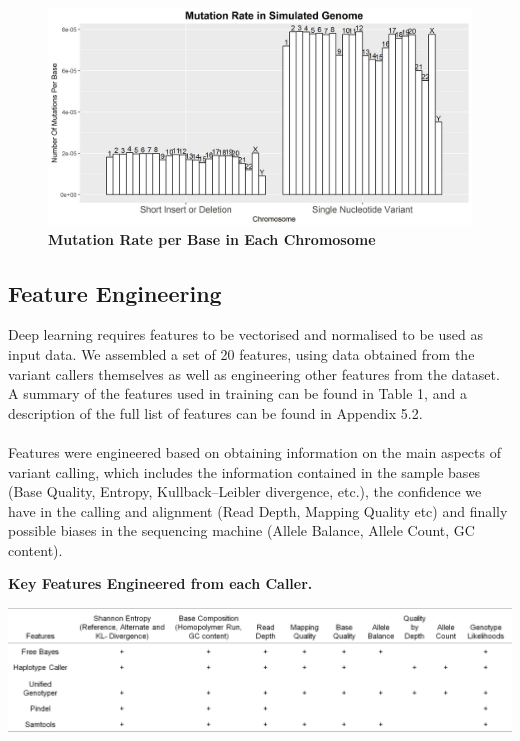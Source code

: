 \documentclass{article}
\begin{document}
\begin{figure}[H]
\centering
\includegraphics[width=\textwidth]{MutationRateInSimulatedGenome.jpg}
\caption{\textbf{Mutation Rate per Base in Each Chromosome}}
\end{figure}

\subsection{Feature Engineering}
Deep learning requires features to be vectorised and normalised to be used as input data. We assembled a set of 20 features, using data obtained from the variant callers themselves as well as engineering other features from the dataset. A summary of the features used in training can be found in Table 1, and a description of the full list of features can be found in Appendix 5.2.\\\\
Features were engineered based on obtaining information on the main aspects of variant calling, which includes the information contained in the sample bases (Base Quality, Entropy, Kullback–Leibler divergence, etc.), the confidence we have in the calling and alignment (Read Depth, Mapping Quality etc) and finally possible biases in the sequencing machine (Allele Balance, Allele Count, GC content).

\begin{table}[H]
\caption{\textbf{Key Features Engineered from each Caller.}}
\includegraphics[width=\textwidth]{featureengineering.png}
\centering
\end{table}
\end{document}
